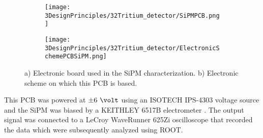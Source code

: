 \begin{figure}
\centering
    \begin{subfigure}[b]{0.8\textwidth}
    \centering
    \texttt{[image: 3DesignPrinciples/32Tritium\_detector/SiPMPCB.png]}  
    \caption{\label{subfig:ElectronicBoardSiPM}}
    \end{subfigure}
    \hfill
    \begin{subfigure}[b]{0.8\textwidth}
    \centering
    \texttt{[image: 3DesignPrinciples/32Tritium\_detector/ElectronicSchemePCBSiPM.png]}  
    \caption{\label{subfig:ElectronicSchemePCBSiPM}}
    \end{subfigure}
    \hfill
 \caption{a) Electronic board used in the SiPM characterization. b) Electronic scheme on which this PCB is based.}
 \label{fig:PCBSiPM}
\end{figure}
This PCB was powered at $\pm6~\volt$ using an ISOTECH IPS-4303 voltage source \cite{VoltageSourceISOTECH} and the SiPM was biased by a KEITHLEY 6517B electrometer \cite{VoltageSourceKethley}. The output signal was connected to a LeCroy WaveRunner 625Zi oscilloscope \cite{OscilloscopeIFIMED} that recorded the data which were subsequently analyzed using ROOT.
